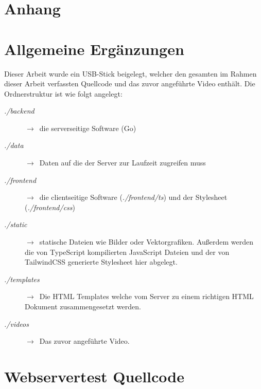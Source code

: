 
\section*{Anhang}\label{sec:anhang}

\appendix
\section*{Allgemeine Ergänzungen}
Dieser Arbeit wurde ein USB-Stick beigelegt, welcher den gesamten im Rahmen 
dieser Arbeit verfassten Quellcode und das zuvor angeführte Video enthält. Die
Ordnerstruktur ist wie folgt angelegt:

\begin{description}
    \item[\textit{./backend}] $\rightarrow$~die serverseitige Software (Go)

    \item[\textit{./data}] $\rightarrow$~Daten auf die der Server zur Laufzeit 
    zugreifen muss

    \item[\textit{./frontend}] $\rightarrow$~die clientseitige Software 
    (\textit{./frontend/ts}) und der Stylesheet (\textit{./frontend/css})

    \item[\textit{./static}] $\rightarrow$~statische Dateien wie Bilder oder Vektorgrafiken.
    Außerdem werden die von TypeScript kompilierten JavaScript Dateien und der 
    von TailwindCSS generierte Stylesheet hier abgelegt.

    \item[\textit{./templates}] $\rightarrow$~Die HTML Templates welche vom Server
    zu einem richtigen HTML Dokument zusammengesetzt werden.
    
    \item[\textit{./videos}] $\rightarrow$~Das zuvor angeführte Video.

\end{description}

\section*{Webservertest Quellcode}






